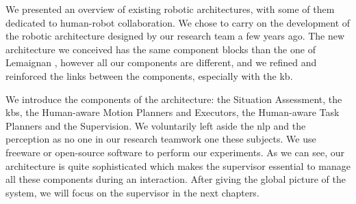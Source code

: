 \documentclass[a4paper,11pt,twoside]{StyleThese}
\begin{document}
We presented an overview of existing robotic architectures, with some of them dedicated to human-robot collaboration. We chose to carry on the development of the robotic architecture designed by our research team a few years ago. The new architecture we conceived has the same component blocks than the one of Lemaignan \etal{}, however all our components are different, and we refined and reinforced the links between the components, especially with the \acrlong{kb}. 

We introduce the components of the architecture: the Situation Assessment, the \acrshort{kb}s, the Human-aware Motion Planners and Executors, the Human-aware Task Planners and the Supervision. We voluntarily left aside the \acrshort{nlp} and the perception as no one in our research teamwork one these subjects. We use freeware or open-source software to perform our experiments. As we can see, our architecture is quite sophisticated which makes the supervisor essential to manage all these components during an interaction. After giving the global picture of the system, we will focus on the supervisor in the next chapters.

\ifdefined{}
\else


\end{document}
